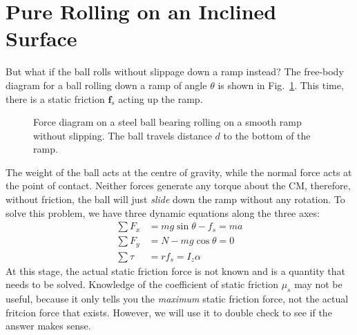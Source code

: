 \documentclass[11pt]{article}
\newcommand{\mb}[1]{\mathbf{#1}}
\begin{document}
%
%
\section{Pure Rolling on an Inclined Surface}
But what if the ball rolls without slippage down a ramp instead? The free-body
diagram for a ball rolling down a ramp of angle $\theta$ is shown in
Fig.~\ref{roll-ramp}. This time, there is a static friction $\mb{f}_s$ acting
up the ramp.
\begin{figure}[!ht]
  \centering
  \caption{Force diagram on a steel ball bearing rolling on a smooth ramp
    without slipping. The ball travels distance $d$ to the bottom of the ramp.}
  \label{roll-ramp}
\end{figure}
The weight of the ball acts at the centre of gravity, while the normal force
acts at the point of contact. Neither forces generate any torque about the CM,
therefore, without
friction, the ball will just \emph{slide} down the ramp without any rotation.
To solve this problem, we have three dynamic equations along the three axes:
\begin{align}
  \sum F_x&=mg\sin\theta-f_s=ma\\ \label{f_x}
  \sum F_y&=N-mg\cos\theta=0\\
  \sum\tau&=rf_s=I_z\alpha \label{tau}
\end{align}
At this stage, the actual static friction force is not known and is a quantity
that needs to be solved. Knowledge of the coefficient of static friction
$\mu_s$ may not be useful, because it only tells you the \emph{maximum} static
friction force, not the actual fritcion force that exists. However, we will use
it to double check to see if the answer makes sense.
\end{document}
